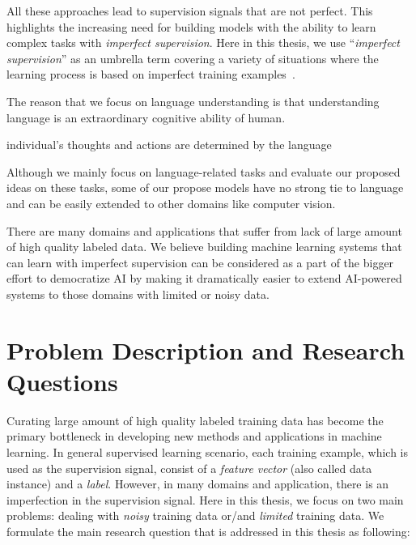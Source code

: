 All these approaches lead to supervision signals that are not perfect. This highlights the increasing need for building models with the ability to learn complex tasks with \emph{imperfect supervision}. Here in this thesis, we use ``\emph{imperfect supervision}'' as an umbrella term covering a variety of situations where the learning process is based on imperfect training examples~\citep{zhou2018brief}.

The reason that we focus on language understanding is that  understanding language is an extraordinary cognitive ability of human.

individual's thoughts and actions are determined by the language



Although we mainly focus on language-related tasks and evaluate our proposed ideas on these tasks, some of our propose models have no strong tie to language and can be easily extended to other domains like computer vision.


There are many domains and applications that suffer from lack of large amount of high quality labeled data. We believe building machine learning systems that can learn with imperfect supervision can be considered as a part of the bigger effort to democratize AI by making it dramatically easier to extend AI-powered systems to those domains with limited or noisy data.




\section{Problem Description and Research Questions}
Curating large amount of high quality labeled training data has become the primary bottleneck in developing new methods and applications in machine learning. 
In general supervised learning scenario, each training example, which is used as the supervision signal, consist of a \emph{feature vector} (also called data instance) and a \emph{label}. However, in many domains and application, there is an imperfection in the supervision signal. Here in this thesis, we focus on two main problems: dealing with \emph{noisy} training data or/and \emph{limited} training data. 
We formulate the main research question that is addressed in this thesis as following:

